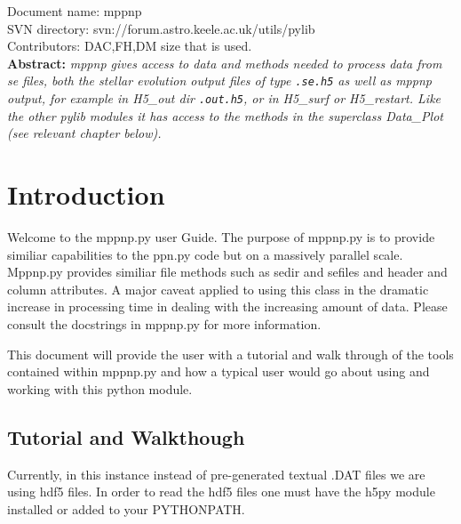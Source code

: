 \renewcommand{\ndoctitle}{mppnp.py: The python workhorse to get, plot and analyse se files} 
\renewcommand{\ndocname}{mppnp}                      
\renewcommand{\svndir}{svn://forum.astro.keele.ac.uk/utils/pylib}  
\renewcommand{\ndoccontribs}{DAC,FH,DM size that is used.}



Document name: \ndocname \\
SVN directory: \svndir\\
Contributors: \ndoccontribs\\



{  \textbf{Abstract:} \slshape
mppnp gives access to data and methods needed to process data from se files, both the stellar evolution output files of type \texttt{.se.h5} as well as mppnp output, for example in H5\_out dir \texttt{.out.h5}, or in H5\_surf or H5\_restart. Like the other pylib modules it has access to the methods in the superclass Data\_Plot (see relevant chapter below). 
}

\section{Introduction}
Welcome to the mppnp.py user Guide. The purpose of mppnp.py is to provide similiar capabilities to the ppn.py code but on a massively parallel scale. Mppnp.py provides similiar file methods such as sedir and sefiles and header and column attributes. 
A major caveat applied to using this class in the dramatic increase in processing time in dealing with  the increasing amount of data.
Please consult the docstrings in mppnp.py for more information.

This document will provide the user with a 
tutorial and walk through of the tools contained within mppnp.py and
how a typical user would go about using and working with this python module.
\subsection{Tutorial and Walkthough}

Currently,  
in this instance instead of pre-generated textual .DAT files we are using hdf5 files.  
In order to read the hdf5 files one must have the h5py module installed or added to your PYTHONPATH.
\newline

